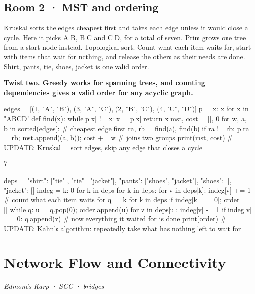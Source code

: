 \documentclass[11pt,a4paper]{report}
\begin{document}
\section*{Room 2 · MST and ordering}
Kruskal sorts the edges cheapest first and takes each edge unless it would close a cycle. Here it picks A B, B C and C D, for a total of seven. Prim grows one tree from a start node instead. Topological sort. Count what each item waits for, start with items that wait for nothing, and release the others as their needs are done. Shirt, pants, tie, shoes, jacket is one valid order.
\begin{tcolorbox}[colback=yellow!12,colframe=orange!70!black,boxrule=0.4pt,left=4pt,right=4pt,top=2pt,bottom=2pt]\textbf{Twist two. Greedy works for spanning trees, and counting dependencies gives a valid order for any acyclic graph.}\end{tcolorbox}
\begin{Code}
edges = [(1, "A", "B"), (3, "A", "C"), (2, "B", "C"), (4, "C", "D")]
p = {x: x for x in "ABCD"}
def find(x):
    while p[x] != x: x = p[x]
    return x
mst, cost = [], 0
for w, a, b in sorted(edges):               # cheapest edge first
    ra, rb = find(a), find(b)
    if ra != rb: p[ra] = rb; mst.append((a, b)); cost += w    # joins two groups
print(mst, cost)
# UPDATE: Kruskal = sort edges, skip any edge that closes a cycle
\end{Code}
\begin{Out}
[('A', 'B'), ('B', 'C'), ('C', 'D')] 7
\end{Out}
\begin{Code}
deps = {"shirt": ["tie"], "tie": ["jacket"], "pants": ["shoes", "jacket"], "shoes": [], "jacket": []}
indeg = {k: 0 for k in deps}
for k in deps:
    for v in deps[k]: indeg[v] += 1         # count what each item waits for
q = [k for k in deps if indeg[k] == 0]; order = []
while q:
    u = q.pop(0); order.append(u)
    for v in deps[u]:
        indeg[v] -= 1
        if indeg[v] == 0: q.append(v)       # now everything it waited for is done
print(order)
# UPDATE: Kahn's algorithm: repeatedly take what has nothing left to wait for
\end{Code}
\begin{Out}
\end{Out}
\chapter{Network Flow and Connectivity}
\textit{Edmonds-Karp · SCC · bridges}
\end{document}
